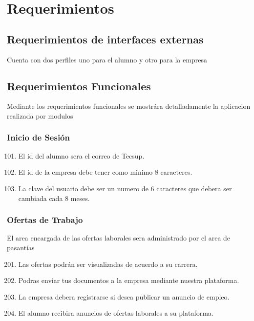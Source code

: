 \chapter{Requerimientos}
\section{Requerimientos de interfaces externas}
Cuenta con dos perfiles uno para el alumno y otro para la empresa

\section{Requerimientos Funcionales}

Mediante los requerimientos funcionales se mostrára detalladamente la aplicacion realizada por modulos

\subsection{Inicio de Sesión}
\begin{flushright}
	\begin{enumerate}
		\setcounter{enumi}{100}
		\item El id del alumno sera el correo de Tecsup.
		\item El id de la empresa debe tener como minimo 8 caracteres.
		\item La clave del usuario debe ser un numero de 6 caracteres que debera ser cambiada cada 8 meses.
	\end{enumerate}
\end{flushright}
\subsection{Ofertas de Trabajo}
El area encargada de las ofertas laborales sera administrado por el area de pasantías
\begin{flushright}
	\begin{enumerate}
		\setcounter{enumi}{200}
		\item Las ofertas podrán ser visualizadas de acuerdo a su carrera.
		\item Podras enviar tus documentos a la empresa mediante nuestra plataforma.
		\item La empresa debera registrarse si desea publicar un anuncio de empleo.
		\item El alumno recibira anuncios de ofertas laborales a su plataforma.
	\end{enumerate}
\end{flushright}
